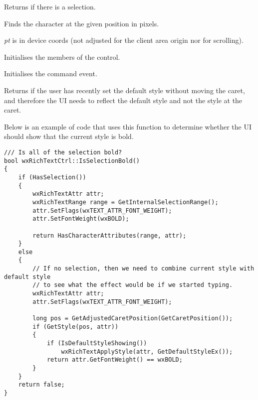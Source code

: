 \label{wxrichtextctrlhasselection}


Returns \true if there is a selection.

\label{wxrichtextctrlhittest}



Finds the character at the given position in pixels.

{\it pt} is in device coords (not adjusted for the client area origin nor for scrolling).

\label{wxrichtextctrlinit}


Initialises the members of the control.

\label{wxrichtextctrlinitcommandevent}


Initialises the command event.

\label{wxrichtextctrlisdefaultstyleshowing}


Returns \true if the user has recently set the default style without moving the caret,
and therefore the UI needs to reflect the default style and not the style at the caret.

Below is an example of code that uses this function to determine whether the UI
should show that the current style is bold.

\begin{verbatim}
/// Is all of the selection bold?
bool wxRichTextCtrl::IsSelectionBold()
{
    if (HasSelection())
    {
        wxRichTextAttr attr;
        wxRichTextRange range = GetInternalSelectionRange();
        attr.SetFlags(wxTEXT_ATTR_FONT_WEIGHT);
        attr.SetFontWeight(wxBOLD);

        return HasCharacterAttributes(range, attr);
    }
    else
    {
        // If no selection, then we need to combine current style with default style
        // to see what the effect would be if we started typing.
        wxRichTextAttr attr;
        attr.SetFlags(wxTEXT_ATTR_FONT_WEIGHT);

        long pos = GetAdjustedCaretPosition(GetCaretPosition());
        if (GetStyle(pos, attr))
        {
            if (IsDefaultStyleShowing())
                wxRichTextApplyStyle(attr, GetDefaultStyleEx());
            return attr.GetFontWeight() == wxBOLD;
        }
    }
    return false;
}
\end{verbatim}

